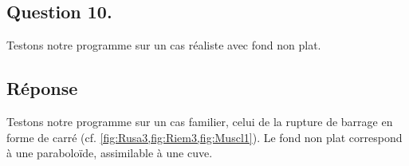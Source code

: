 \documentclass[
	french,
	11pt, %
]{fphw}
\begin{document}
\subsection*{Question 10.}

\begin{problem}
	Testons notre programme sur un cas réaliste avec fond non plat. 
\end{problem}

\subsection*{Réponse} 

Testons notre programme sur un cas familier, celui de la rupture de barrage en forme de carré (cf. \cref{fig:Rusa3,fig:Riem3,fig:Muscl1}). Le fond non plat correspond à une paraboloïde, assimilable à une cuve.
\end{document}
